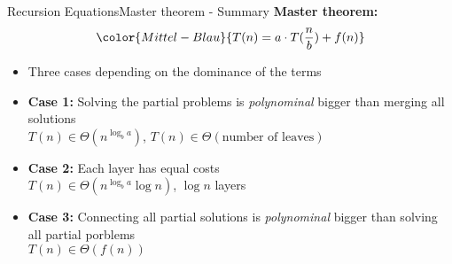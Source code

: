 \begin{frame}{Recursion Equations}{Master theorem - Summary}
  \textbf{Master theorem:}
  \begin{displaymath}
    \color{Mittel-Blau}{
      T(n) = a \cdot T(\frac{n}{b}) + f(n)
    }
  \end{displaymath}
  \vspace{-1.0em}
  \begin{itemize}
    \item<3->
      Three cases depending on the dominance of the terms
    \item<4->
      \textbf{Case 1:}
      Solving the partial problems is \textit{polynominal} bigger than merging
      all solutions\\
      {\color{Mittel-Blau}$T(n) \in \Theta(n^{\log_b a})$}, \hspace{3.5em}
      {\color{gray}$T(n) \in \Theta(\text{number of leaves})$}
      \vspace{0.5em}
   \item<5->
     \textbf{Case 2:}
     Each layer has equal costs\\
     {\color{Mittel-Blau}$T(n) \in \Theta(n^{\log_b a} \log n)$}, \hspace{1.5em}
     {\color{gray}$\log n$ layers}
     \vspace{0.5em}
   \item<6->
     \textbf{Case 3:}
     Connecting all partial solutions is \textit{polynominal} bigger than
     solving all partial porblems\\
     {\color{Mittel-Blau}$T(n) \in \Theta(f(n))$}
  \end{itemize}
\end{frame}

